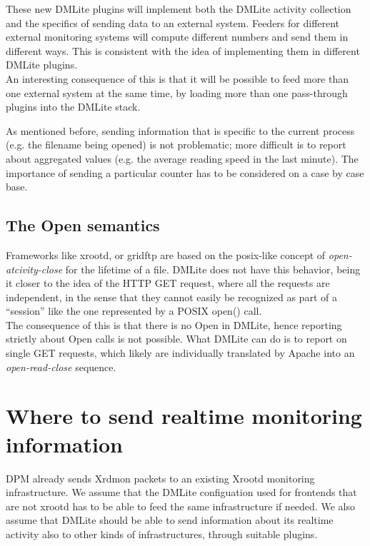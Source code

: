 \documentclass[12pt]{article} %
\begin{document}
These new DMLite plugins will implement both the DMLite activity collection and the specifics of sending data to an external system. Feeders for different external monitoring systems will compute different numbers and send them in different ways. This is consistent with the idea of implementing them in different DMLite plugins.\\

An interesting consequence of this is that it will be possible to feed more than one external system at the same time, by loading more than one pass-through plugins into the DMLite stack.

As mentioned before, sending information that is specific to the current process (e.g. the filename being opened) is not problematic; more difficult is to report about aggregated values (e.g. the average reading speed in the last minute). The importance of sending a particular counter has to be considered on a case by case base.\\


\subsection{The Open semantics}

Frameworks like xrootd, or gridftp are based on the posix-like concept of \textit{open-atcivity-close} for the lifetime of a file. DMLite does not have this behavior, being it closer to the idea of the HTTP GET request, where all the requests are independent, in the sense that they cannot easily be recognized as part of a ``session'' like the one represented by a POSIX open() call.\\

The consequence of this is that there is no Open in DMLite, hence reporting strictly about Open calls is not possible. What DMLite can do is to report on single GET requests, which likely are individually translated by Apache into an \textit{open-read-close} sequence.

\section{Where to send realtime monitoring information}

DPM already sends Xrdmon packets to an existing Xrootd monitoring infrastructure. We assume that the DMLite configuation used for frontends that are not xrootd has to be able to feed the same infrastructure if needed. We also assume that DMLite should be able to send information about its realtime activity also to other kinds of infrastructures, through suitable plugins.
\end{document}
